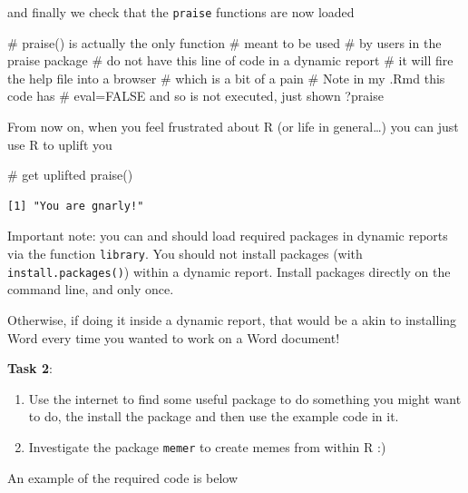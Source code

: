 \documentclass[
  letterpaper,
  DIV=11,
  numbers=noendperiod]{scrartcl}
\newenvironment{Shaded}{\begin{snugshade}}{\end{snugshade}}
\newcommand{\CommentTok}[1]{\textcolor[rgb]{0.37,0.37,0.37}{#1}}
\newcommand{\FunctionTok}[1]{\textcolor[rgb]{0.28,0.35,0.67}{#1}}
\newcommand{\NormalTok}[1]{\textcolor[rgb]{0.00,0.23,0.31}{#1}}
\begin{document}
and finally we check that the \texttt{praise} functions are now loaded

\begin{Shaded}
\begin{Highlighting}[]
\CommentTok{\# praise() is actually the only function }
\CommentTok{\# meant to be used}
\CommentTok{\# by users in the praise package}
\CommentTok{\# do not have this line of code in a dynamic report}
\CommentTok{\# it will fire the help file into a browser}
\CommentTok{\# which is a bit of a pain}
\CommentTok{\# Note in my .Rmd this code has}
\CommentTok{\# eval=FALSE and so is not executed, just shown}
\NormalTok{?praise}
\end{Highlighting}
\end{Shaded}

From now on, when you feel frustrated about R (or life in general\ldots)
you can just use R to uplift you

\begin{Shaded}
\begin{Highlighting}[]
\CommentTok{\# get uplifted}
\FunctionTok{praise}\NormalTok{()}
\end{Highlighting}
\end{Shaded}

\begin{verbatim}
[1] "You are gnarly!"
\end{verbatim}

Important note: you can and should load required packages in dynamic
reports via the function \texttt{library}. You should not install
packages (with \texttt{install.packages()}) within a dynamic report.
Install packages directly on the command line, and only once.

Otherwise, if doing it inside a dynamic report, that would be a akin to
installing Word every time you wanted to work on a Word document!

\textbf{Task 2}:

\begin{enumerate}
\def\labelenumi{\arabic{enumi}.}
\item
  Use the internet to find some useful package to do something you might
  want to do, the install the package and then use the example code in
  it.
\item
  Investigate the package \texttt{memer} to create memes from within R
  :)
\end{enumerate}

An example of the required code is below
\end{document}
